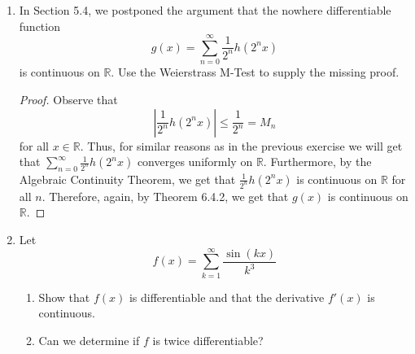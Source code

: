 \begin{enumerate}
    \begin{proof}
    \begin{enumerate}
        \item We observe that
        \[
        \vert f_n(x) \vert = \left| \frac{\cos(2^nx)}{2^n} \right| \leq \frac{1}{2^n} = M_n
        \]
        for all \( x \in \mathbb{R} \). Moreover, \( \sum M_n = \sum ( 1/2)^n \) is convergent. Therefore, by the M-Test, we have that \( \sum \frac{\cos(2^nx)}{2^n} \) is uniformly convergent on \( \mathbb{R} \). Since \( f_n \) is continuous on \( \mathbb{R} \) for every \( n \), it follows, by Theorem 6.4.2, that \( \sum f_n = \sum \frac{\cos(2^nx)}{2^n} \) is continuous on \( \mathbb{R} \)
        
        \item we observe that, on \( [-1,1] \), we get that
        \[
        \left| \frac{x^n}{n^2} \right| \leq \frac{1}{n^2} = M_n
        \]
        Furthermore, \( \sum \frac{1}{n^2} \) is convergent, and therefore, by the M-Test, we get that \( \sum_{n=1}^{\infty} \frac{x^n}{n^2} \) is uniformly convergent on \( [-1,1] \). Furthermore, since 
    \end{enumerate}
    \end{proof}
    
    \item In Section 5.4, we postponed the argument that the nowhere differentiable function
    \[
    g(x) = \sum_{n=0}^{\infty} \frac{1}{2^n}h(2^nx)
    \]
    is continuous on \( \mathbb{R} \). Use the Weierstrass M-Test to supply the missing proof.
    
    \begin{proof}
    Observe that
    \[
    \left| \frac{1}{2^n}h(2^nx) \right| \leq \frac{1}{2^n} = M_n
    \]
    for all \( x \in \mathbb{R} \). Thus, for similar reasons as in the previous exercise we will get that \( \sum_{n=0}^{\infty} \frac{1}{2^n}h(2^nx) \) converges uniformly on \( \mathbb{R} \). Furthermore, by the Algebraic Continuity Theorem, we get that \( \frac{1}{2^n}h(2^nx) \) is continuous on \( \mathbb{R} \) for all \( n \). Therefore, again, by Theorem 6.4.2, we get that \( g(x) \) is continuous on \( \mathbb{R} \).
    \end{proof}
    
    \item Let
    \[
    f(x) = \sum_{k=1}^{\infty} \frac{\sin(kx)}{k^3}
    \]
    \begin{enumerate}
        \item Show that \( f(x) \) is differentiable and that the derivative \( f'(x) \) is continuous.
        \item Can we determine if \( f \) is twice differentiable?
    \end{enumerate}
    

\end{enumerate}

